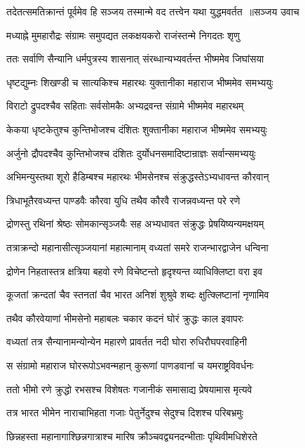 \threelineshloka
{तदेतत्समतिक्रान्तं पूर्वमेव हि सञ्जय}
{तस्मान्मे वद तत्त्वेन यथा युद्धमवर्तत ॥सञ्जय उवाच}
{}


\twolineshloka
{मध्याह्ने मुमहारौद्रः संग्रामः समुपद्यत}
{लकक्षयकरो राजंस्तन्मे निगदतः शृणु}


\twolineshloka
{ततः सर्वाणि सैन्यानि धर्मपुत्रस्य शासनात्}
{संरब्धान्यभ्यवर्तन्त भीष्ममेव जिघांसया}


\twolineshloka
{धृष्टद्युम्नः शिखण्डी च सात्यकिश्च महारथः}
{युक्तानीका महाराज भीष्ममेव समभ्ययुः}


\twolineshloka
{विराटो द्रुपदश्चैव सहिताः सर्वसोमकैः}
{अभ्यद्रवन्त संग्रामे भीष्ममेव महारथम्}


\twolineshloka
{केकया धृष्टकेतुश्च कुन्तिभोजश्च दंशितः}
{शुक्तानीका महाराज भीष्ममेव समभ्ययुः}


\twolineshloka
{अर्जुनो द्रौपदश्चैव कुन्तिभोजश्च दंशितः}
{दुर्योधनसमादिष्टान्राज्ञः सर्वान्समभ्ययुः}


\twolineshloka
{अभिमन्युस्तथा शूरो हैडिम्बश्च महारथः}
{भीमसेनश्च संक्रुद्धस्तेऽभ्यधावन्त कौरवान्}


\twolineshloka
{त्रिधाभूतैरवध्यन्त पाण्डवैः कौरवा युधि}
{तथैव कौरवै राजन्नवध्यन्त परे रणे}


\twolineshloka
{द्रोणस्तु रथिनां श्रेष्ठः सोमकान्सृञ्जयैः सह}
{अभ्यधावत संक्रुद्धः प्रेषयिष्यन्यमक्षयम्}


\twolineshloka
{तत्राक्रन्दो महानासीत्सृञ्जयानां महात्मानाम्}
{वध्यतां समरे राजन्भारद्वाजेन धन्विना}


\twolineshloka
{द्रोणेन निहतास्तत्र क्षत्रिया बहवो रणे}
{विचेष्टन्तो हृदृश्यन्त व्याधिक्लिष्टा वरा इव}


\twolineshloka
{कूजतां क्रन्दतां चैव स्तनतां चैव भारत}
{अनिशं शुश्रुवे शब्दः क्षुत्क्लिष्टानां नृणामिव}


\twolineshloka
{तथैव कौरवेयाणां भीमसेनो महाबलः}
{चकार कदनं घोरं क्रुद्धः काल इवापरः}


\twolineshloka
{वध्यतां तत्र सैन्यानामन्योन्येन महारणे}
{प्रावर्तत नदी घोरा रुधिरौघपरवाहिनी}


\twolineshloka
{स संग्रामो महाराज घोररूपोऽभवन्महान्}
{कुरूणां पाणडवानां च यमराष्ट्रविवर्धनः}


\twolineshloka
{ततो भीमो रणे क्रुद्धो रभसश्च विशेषतः}
{गजानीकं समासाद्य प्रेषयामास मृत्यवे}


\twolineshloka
{तत्र भारत भीमेन नाराचाभिहता गजाः}
{पेतुर्नेदुश्च सेदुश्च दिशश्च परिबभ्रमुः}


\twolineshloka
{छिन्नहस्ता महानागाश्छिन्नगात्राश्च मारिष}
{क्रौञ्चवद्व्यनदन्भीताः पृथिवीमधिशेरते}


